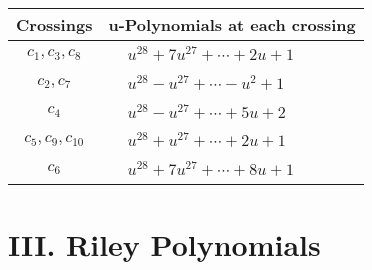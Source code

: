 \documentclass[1p]{elsarticle_modified}
\theoremstyle{definition}
\begin{document}
\begin{tabular}{m{50pt}|m{274pt}}
Crossings & \hspace{64pt}u-Polynomials at each crossing \\
\hline $$\begin{aligned}c_{1},c_{3},c_{8}\end{aligned}$$&$\begin{aligned}
&u^{28}+7 u^{27}+\cdots+2 u+1
\end{aligned}$\\
\hline $$\begin{aligned}c_{2},c_{7}\end{aligned}$$&$\begin{aligned}
&u^{28}- u^{27}+\cdots- u^2+1
\end{aligned}$\\
\hline $$\begin{aligned}c_{4}\end{aligned}$$&$\begin{aligned}
&u^{28}- u^{27}+\cdots+5 u+2
\end{aligned}$\\
\hline $$\begin{aligned}c_{5},c_{9},c_{10}\end{aligned}$$&$\begin{aligned}
&u^{28}+u^{27}+\cdots+2 u+1
\end{aligned}$\\
\hline $$\begin{aligned}c_{6}\end{aligned}$$&$\begin{aligned}
&u^{28}+7 u^{27}+\cdots+8 u+1
\end{aligned}$\\
\hline
\end{tabular}\newpage\renewcommand{\arraystretch}{1}
\centering \section*{ III. Riley Polynomials}
\end{document}
